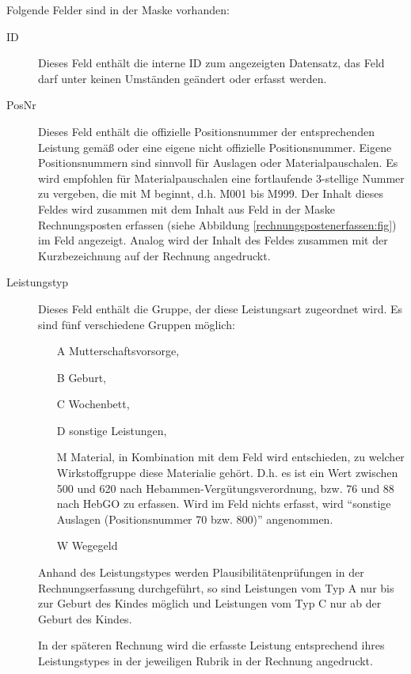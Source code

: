 Folgende Felder sind in der Maske vorhanden:
\begin{description}
\item[ID] Dieses Feld enthält die interne ID zum angezeigten Datensatz, das
Feld darf unter keinen Umständen geändert oder erfasst werden.
\item[PosNr] Dieses Feld enthält die offizielle Positionsnummer der
entsprechenden Leistung gemäß \cite{posnr} oder eine eigene nicht offizielle
Positionsnummer. Eigene Positionsnummern sind sinnvoll für Auslagen oder
Materialpauschalen. Es wird empfohlen für Materialpauschalen eine fortlaufende
3-stellige Nummer zu vergeben, die mit M beginnt, d.h. M001 bis M999. Der Inhalt
dieses Feldes wird zusammen mit dem Inhalt aus Feld 
in der Maske Rechnungsposten erfassen (siehe Abbildung 
\vref{rechnungspostenerfassen:fig}) im Feld  angezeigt.
Analog wird der Inhalt des Feldes zusammen mit der Kurzbezeichnung auf
der Rechnung angedruckt.
\item[Leistungstyp] Dieses Feld enthält die Gruppe, der diese 
Leistungsart zugeordnet wird. Es sind fünf verschiedene Gruppen möglich:
\begin{enumerate}
\item[A] Mutterschaftsvorsorge,
\item[B] Geburt,
\item[C] Wochenbett,
\item[D] sonstige Leistungen,
\item[M] 
Material, in Kombination mit dem Feld  wird
entschieden, zu welcher Wirkstoffgruppe diese Materialie gehört. D.h. es
ist ein Wert zwischen 500 und 620 nach Hebammen-Vergütungsverordnung,
bzw. 76 und 88 nach HebGO zu erfassen. Wird im Feld 
nichts erfasst, wird ``sonstige Auslagen (Positionsnummer 70 bzw. 800)'' 
angenommen.
\item[W] 
Wegegeld
\end{enumerate}

Anhand des Leistungstypes werden Plausibilitätenprüfungen in der
Rechnungserfassung durchgeführt, so sind Leistungen vom Typ A nur bis
zur Geburt des Kindes möglich und Leistungen vom Typ C nur ab der Geburt
des Kindes.

In der späteren Rechnung wird die erfasste Leistung entsprechend ihres
Leistungstypes in der jeweiligen Rubrik in der Rechnung angedruckt.


\end{description}
